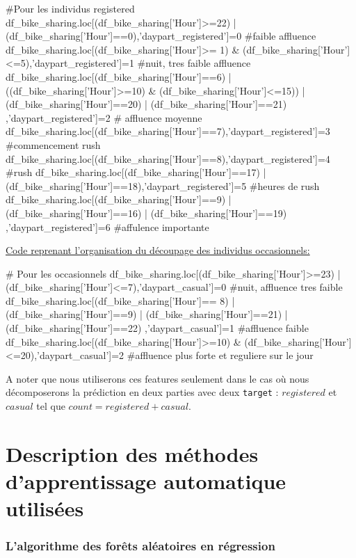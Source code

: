 \documentclass[a4paper,oneside,11pt]{article}
\begin{document}
\begin{code-Python}
   #Pour les individus registered
    df_bike_sharing.loc[(df_bike_sharing['Hour']>=22)  | (df_bike_sharing['Hour']==0),'daypart_registered']=0 #faible affluence
        df_bike_sharing.loc[(df_bike_sharing['Hour']>= 1)  & (df_bike_sharing['Hour']<=5),'daypart_registered']=1 #nuit, tres faible affluence
    df_bike_sharing.loc[(df_bike_sharing['Hour']==6) 
                        | ((df_bike_sharing['Hour']>=10) & (df_bike_sharing['Hour']<=15)) 
                        | (df_bike_sharing['Hour']==20) 
                        | (df_bike_sharing['Hour']==21)
                       ,'daypart_registered']=2 # affluence moyenne
    df_bike_sharing.loc[(df_bike_sharing['Hour']==7),'daypart_registered']=3 #commencement rush
    df_bike_sharing.loc[(df_bike_sharing['Hour']==8),'daypart_registered']=4 #rush
    df_bike_sharing.loc[(df_bike_sharing['Hour']==17)  | (df_bike_sharing['Hour']==18),'daypart_registered']=5 #heures de rush
    df_bike_sharing.loc[(df_bike_sharing['Hour']==9)  
                        |(df_bike_sharing['Hour']==16)  
                        | (df_bike_sharing['Hour']==19)
                        ,'daypart_registered']=6 #affulence importante
\end{code-Python}
\newpage
\underline{Code reprenant l'organisation du découpage des individus occasionnels:}
\begin{code-Python}
    # Pour les occasionnels
    df_bike_sharing.loc[(df_bike_sharing['Hour']>=23)  | (df_bike_sharing['Hour']<=7),'daypart_casual']=0 #nuit, affluence tres faible
    df_bike_sharing.loc[(df_bike_sharing['Hour']== 8) 
                        | (df_bike_sharing['Hour']==9)
                        | (df_bike_sharing['Hour']==21)
                        | (df_bike_sharing['Hour']==22)
                    ,'daypart_casual']=1 #affluence faible
    df_bike_sharing.loc[(df_bike_sharing['Hour']>=10) & (df_bike_sharing['Hour']<=20),'daypart_casual']=2 #affluence plus forte et reguliere sur le jour
\end{code-Python}

A noter que nous utiliserons ces features seulement dans le cas où nous décomposerons la prédiction en deux parties avec deux \verb+target+ : $registered$ et $casual$ tel que $count=registered+casual$.
\newpage
\part{Description des méthodes d'apprentissage automatique utilisées}
\section*{L'algorithme des forêts aléatoires en régression}
%
\end{document}
